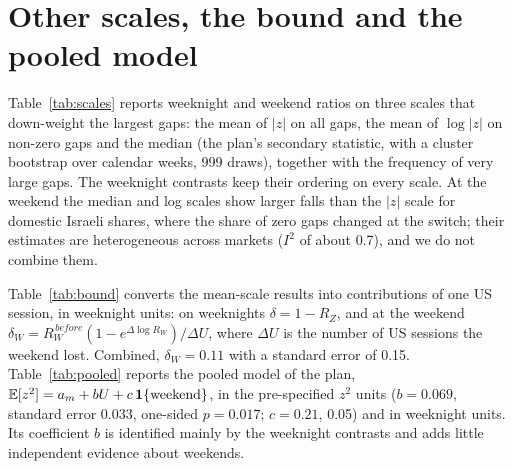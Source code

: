 \FloatBarrier
\section{Other scales, the bound and the pooled model}\label{app:scales}
Table~\ref{tab:scales} reports weeknight and weekend ratios on three scales that down-weight the largest gaps: the mean of $|z|$ on all gaps, the mean of $\log|z|$ on non-zero gaps and the median (the plan's secondary statistic, with a cluster bootstrap over calendar weeks, 999 draws), together with the frequency of very large gaps. The weeknight contrasts keep their ordering on every scale. At the weekend the median and log scales show larger falls than the $|z|$ scale for domestic Israeli shares, where the share of zero gaps changed at the switch; their estimates are heterogeneous across markets ($I^2$ of about 0.7), and we do not combine them.

Table~\ref{tab:bound} converts the mean-scale results into contributions of one US session, in weeknight units: on weeknights $\delta=1-R_Z$, and at the weekend $\delta_W=R_W^{\,before}(1-e^{\Delta\log R_W})/\Delta U$, where $\Delta U$ is the number of US sessions the weekend lost. Combined, $\delta_W=0.11$ with a standard error of 0.15. Table~\ref{tab:pooled} reports the pooled model of the plan, $\mathbb{E}[z^2]=a_m+bU+c\,\mathbf 1\{\text{weekend}\}$, in the pre-specified $z^2$ units ($b=0.069$, standard error 0.033, one-sided $p=0.017$; $c=0.21$, 0.05) and in weeknight units. Its coefficient $b$ is identified mainly by the weeknight contrasts and adds little independent evidence about weekends.

